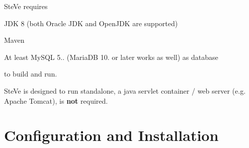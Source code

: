 Ste\-Ve requires
\begin{DoxyItemize}
\item J\-D\-K 8 (both Oracle J\-D\-K and Open\-J\-D\-K are supported)
\item Maven
\item At least My\-S\-Q\-L 5.. (Maria\-D\-B 10. or later works as well) as database
\end{DoxyItemize}

to build and run.

Ste\-Ve is designed to run standalone, a java servlet container / web server (e.\-g. Apache Tomcat), is {\bfseries not} required.

\section*{Configuration and Installation}


